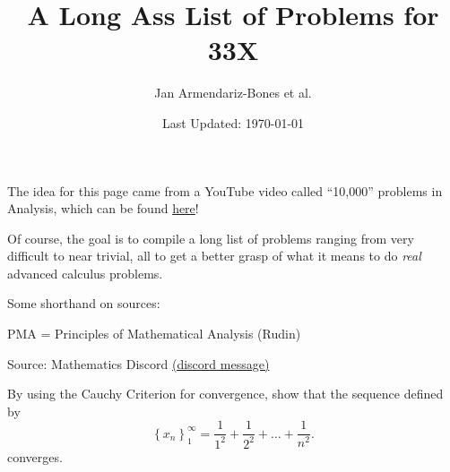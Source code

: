 \documentclass[letterpaper,twoside]{book}
\title{A Long Ass List of Problems for 33X}
\author{Jan Armendariz-Bones et al.}
\date{Last Updated: \today}
\begin{document}
{\let\newpage\relax\maketitle}
\maketitle
The idea for this page came from a YouTube video called ``10,000'' problems in Analysis, which can be found \href{https://youtu.be/3mvNug_YM-g?si=9sa2EVkcANsY7IBk}{here}!

Of course, the goal is to compile a long list of problems ranging from very difficult to near trivial, all to get a better grasp of what it means to do \emph{real} advanced calculus problems.

Some shorthand on sources:

\noindent PMA = Principles of Mathematical Analysis (Rudin)
\newpage
\begin{que}
		Source: Mathematics Discord \href{https://discord.com/channels/268882317391429632/576508782637744130/1169106442435969094}{(discord message)}

		By using the Cauchy Criterion for convergence, show that the sequence defined by \[\left\{x_n\right\}_1^\infty=\frac{1}{1^2}	+ \frac{1}{2^2}	+ \dots + \frac{1}{n^2}.\] converges.
\end{que}	
\end{document}
